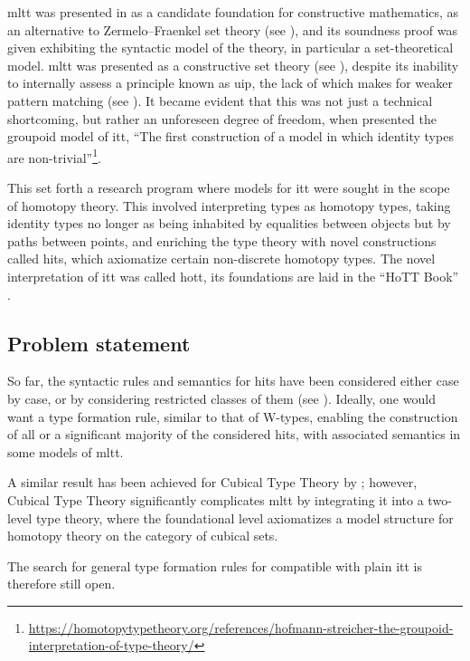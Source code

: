 \documentclass[a4paper]{article}
\begin{document}
\Gls{mltt} was presented in \cite{MartinLoef1998} as a candidate foundation for constructive mathematics, as an alternative to Zermelo–Fraenkel set theory (see \cite[Introduction]{MartinLoef1998}), and its soundness proof was given exhibiting the syntactic model of the theory, in particular a set-theoretical model. \Gls{mltt} was presented as a constructive set theory (see \cite{Nordstroem1990}), despite its inability to internally assess a principle known as \gls{uip}, the lack of which makes for weaker pattern matching (see \textcite{Cockx2016}). It became evident that this was not just a technical shortcoming, but rather an unforeseen degree of freedom, when \textcite{Hofmann1998} presented the groupoid model of \gls{itt}, ``The first construction of a model in which identity types are non-trivial''\footnote{\url{https://homotopytypetheory.org/references/hofmann-streicher-the-groupoid-interpretation-of-type-theory/}}.

This set forth a research program where models for \gls{itt} were sought in the scope of homotopy theory. This involved interpreting types as homotopy types, taking identity types no longer as being inhabited by equalities between objects but by paths between points, and enriching the type theory with novel constructions called \glspl{hit}, which axiomatize certain non-discrete homotopy types. The novel interpretation of \gls{itt} was called \gls{hott}, its foundations are laid in the ``HoTT Book'' \cite{UnivalentFoundationsProgram2013}.

\subsection{Problem statement}

So far, the syntactic rules and semantics for \glspl{hit} have been considered either case by case, or by considering restricted classes of them (see \textcite[Section 1.2]{Kaposi2020}).
Ideally, one would want a type formation rule, similar to that of W-types, enabling the construction of all or a significant majority of the considered \glspl{hit}, with associated semantics in some models of \gls{mltt}.

A similar result has been achieved for Cubical Type Theory by \textcite{Vezzosi2021}; however, Cubical Type Theory significantly complicates \gls{mltt} by integrating it into a two-level type theory, where the foundational level axiomatizes a model structure for homotopy theory on the category of cubical sets.

The search for general type formation rules for  compatible with plain \gls{itt} is therefore still open.
\end{document}
